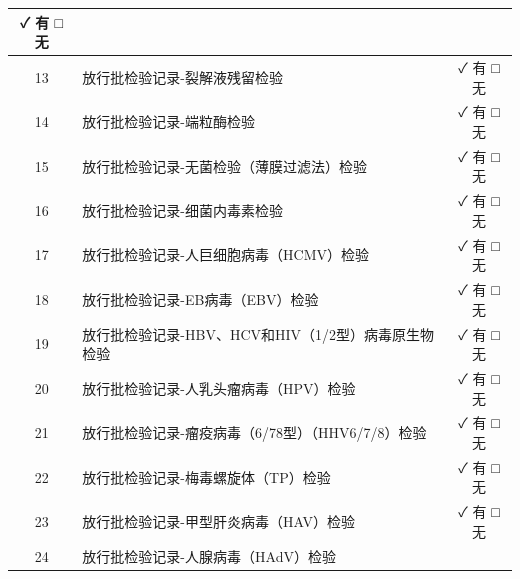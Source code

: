 \documentclass[UTF8,10pt,a4paper,fontset=fandol]{ctexart}
\newcommand{\fieldvalue}[1]{#1}
\newcommand{\handwritten}[1]{#1}
\begin{document}
\begin{center}
\begin{tabularx}{\textwidth}{|c|X|c|}
\fieldvalue{\handwritten{✓ 有}} \quad □无 \\
\hline
13 & 放行批检验记录-裂解液残留检验 &
\fieldvalue{\handwritten{✓ 有}} \quad □无 \\
\hline
14 & 放行批检验记录-端粒酶检验 &
\fieldvalue{\handwritten{✓ 有}} \quad □无 \\
\hline
15 & 放行批检验记录-无菌检验（薄膜过滤法）检验 &
\fieldvalue{\handwritten{✓ 有}} \quad □无 \\
\hline
16 & 放行批检验记录-细菌内毒素检验 &
\fieldvalue{\handwritten{✓ 有}} \quad □无 \\
\hline
17 & 放行批检验记录-人巨细胞病毒（HCMV）检验 &
\fieldvalue{\handwritten{✓ 有}} \quad □无 \\
\hline
18 & 放行批检验记录-EB病毒（EBV）检验 &
\fieldvalue{\handwritten{✓ 有}} \quad □无 \\
\hline
19 & 放行批检验记录-HBV、HCV和HIV（1/2型）病毒原生物检验 &
\fieldvalue{\handwritten{✓ 有}} \quad □无 \\
\hline
20 & 放行批检验记录-人乳头瘤病毒（HPV）检验 &
\fieldvalue{\handwritten{✓ 有}} \quad □无 \\
\hline
21 & 放行批检验记录-瘤疫病毒（6/78型）（HHV6/7/8）检验 &
\fieldvalue{\handwritten{✓ 有}} \quad □无 \\
\hline
22 & 放行批检验记录-梅毒螺旋体（TP）检验 &
\fieldvalue{\handwritten{✓ 有}} \quad □无 \\
\hline
23 & 放行批检验记录-甲型肝炎病毒（HAV）检验 &
\fieldvalue{\handwritten{✓ 有}} \quad □无 \\
\hline
24 & 放行批检验记录-人腺病毒（HAdV）检验 &

\end{tabularx}
\end{center}
\end{document}
